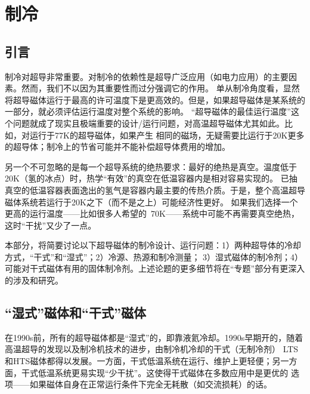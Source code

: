 \chapter{制冷}
\section{引言}
制冷对超导非常重要。对制冷的依赖性是超导广泛应用（如电力应用）的主要因素。然而，我们不以因为其重要性而过分强调它的作用。
单从制冷角度看，显然将超导磁体运行于最高的许可温度下是更高效的。但是，如果超导磁体是某系统的一部分，就必须评估运行温度对整个系统的影响。
“超导磁体的最佳运行温度”这个问题就成了现实且极端重要的设计/运行问题，对高温超导磁体尤其如此。比如，对运行于77K的超导磁体，如果产生
相同的磁场，无疑需要比运行于20K更多的超导体；制冷上的节省可能并不能补偿超导体费用的增加。

另一个不可忽略的是每一个超导系统的绝热要求：最好的绝热是真空。温度低于20K（氢的冰点）时，热学“有效”的真空在低温容器内是相对容易实现的。
已抽真空的低温容器表面逸出的氢气是容器内最主要的传热介质。于是，整个高温超导磁体系统若运行于20K之下（而不是之上）可能经济性更好。
如果我们选择一个更高的运行温度——比如很多人希望的~70K——系统中可能不再需要真空绝热，这时“干扰”又少了一点。

本部分，将简要讨论以下超导磁体的制冷设计、运行问题：1）两种超导体的冷却方式，“干式”和“湿式”；2）冷源、热源和制冷测量；
3）湿式磁体的制冷剂；4）可能对干式磁体有用的固体制冷剂。上述论题的更多细节将在“专题”部分有更深入的涉及和研究。

\section{“湿式”磁体和“干式”磁体}
在1990s前，所有的超导磁体都是“湿式”的，即靠液氦冷却。1990s早期开的，随着高温超导的发现以及制冷机技术的进步，由制冷机冷却的干式（无制冷剂）
LTS和HTS磁体都得以发展。一方面，干式低温系统在运行、维护上更轻便；另一方面，干式低温系统更易实现“少干扰”。这使得干式磁体在多数应用中是更优的
选项——如果磁体自身在正常运行条件下完全无耗散（如交流损耗）的话。

